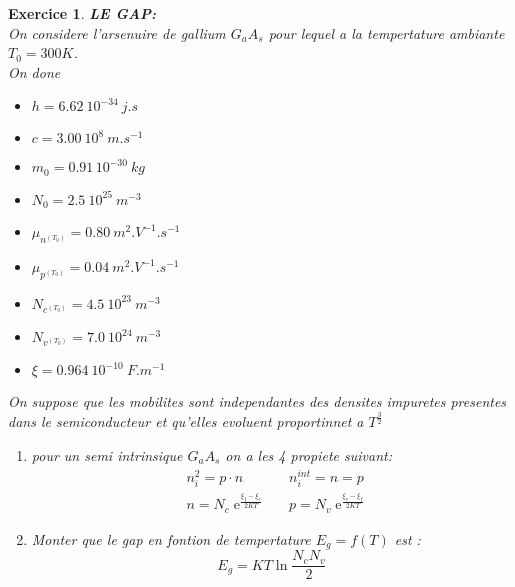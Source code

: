 \documentclass[twocolumn,french]{article}
\DeclareMathOperator{\e}{e}
\theoremstyle{plain}
\newtheorem{exo}{Exercice}%
\begin{document}
\color{black}
\begin{exo}
\textit{\textbf{ LE GAP:}} \\
On considere l'arsenuire de gallium $G_aA_s$ pour lequel a la tempertature
ambiante $T_0=300K$.\\
On done
\begin{itemize}
	\item[$\blacksquare$] $h = 6.62\ 10^{-34}\ j.s$
	\item[$\blacksquare$] $c = 3.00\ 10^8\ m.s^{-1}$
	\item[$\blacksquare$] $m_0 = 0.91\,10^{-30}\ kg$
  \item[$\blacksquare$] $N_0 = 2.5\ 10^{25}\ m^{-3}$
  \item[$\blacksquare$] $\mu_{n^{(T_0)}} = 0.80\ m^2.V^{-1}.s^{-1}$
  \item[$\blacksquare$] $\mu_{p^{(T_0)}} = 0.04\ m^2.V^{-1}.s^{-1}$
  \item[$\blacksquare$] $N_{c^{(T_0)}} = 4.5\ 10^{23}\ m^{-3}$
  \item[$\blacksquare$] $N_{v^{(T_0)}} = 7.0\ 10^{24}\ m^{-3}$
  \item[$\blacksquare$] $\xi = 0.964\ 10^{-10}\ F.m^{-1}$
\end{itemize}
On suppose que les mobilites sont independantes des densites 
impuretes presentes dans le semiconducteur et qu'elles evoluent
proportinnet a $T^{\frac{3}{2}}$

\begin{enumerate}
  \item[] pour un semi intrinsique $G_aA_s$ on a les 4 
   propiete suivant:
  \begin{align*}
    &n_i^2=p\cdot n                       &  &n_i^{int}=n=p            \\
    &n=N_c\e^{\frac{\xi_f-\xi_c}{2KT}}    &  &p=N_v\e^{\frac{\xi_v-\xi_f}{2KT}} 
  \end{align*}
\item Monter que le gap en fontion de tempertature $E_g=f(T)$ est :
    \begin{equation}
      E_g=KT\ln \frac{N_cN_v}{2}
      \label{eq:1}
    \end{equation}
    
\end{enumerate}

\end{exo}


\end{document}
